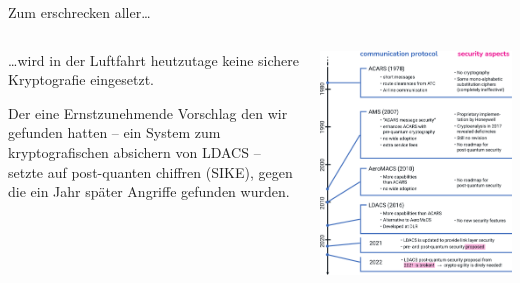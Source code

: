 \begin{frame}[c]{Zum erschrecken aller…}

  \begin{columns}[fullwidth,c]
    \begin{column}{.5\linewidth}
      \begin{itemize}

        \footnotesize
        …wird in der Luftfahrt heutzutage keine sichere Kryptografie eingesetzt. 

        \vspace{1em}
        Der eine Ernstzunehmende Vorschlag den wir gefunden hatten -- ein System zum kryptografischen absichern von LDACS --
        setzte auf post-quanten chiffren (SIKE), gegen die ein Jahr später Angriffe gefunden wurden.

      \end{itemize}
    \end{column}%
    \begin{column}{.5\linewidth}
      \includegraphics[width=.92\linewidth]{graphics/history of cryptography in avionics}
    \end{column}
  \end{columns}
\end{frame}


